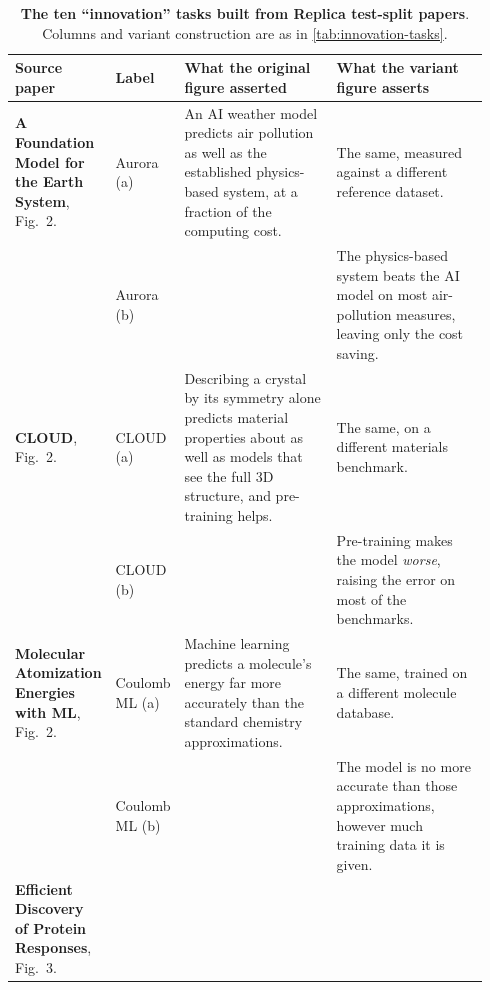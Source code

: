 \documentclass[garamond,a4paper]{inherent}
\begin{document}
\begin{table}[htbp]
    \centering
    \caption{\textbf{The ten ``innovation'' tasks built from Replica test-split papers}. Columns and variant construction are as in \autoref{tab:innovation-tasks}.
    }
    \label{tab:innovation-tasks-test}
    \footnotesize
    \renewcommand{\arraystretch}{1.05}
    \setlength{\tabcolsep}{3pt}
    \begin{tabular}{@{}>{\raggedright\arraybackslash}p{0.165\linewidth} >{\raggedright\arraybackslash}p{0.105\linewidth} >{\raggedright\arraybackslash}p{0.335\linewidth} >{\raggedright\arraybackslash}p{0.335\linewidth}@{}}
        \toprule
        \textbf{Source paper} & \textbf{Label} & \textbf{What the original figure asserted} & \textbf{What the variant figure asserts} \\
        \midrule
        \textbf{A Foundation Model for the Earth System}\newline\cite{bodnar2025aurora}, Fig.~2.
        & Aurora (a) & An AI weather model predicts air pollution as well as the established physics-based system, at a fraction of the computing cost. & The same, measured against a different reference dataset. \\
        & Aurora (b) & & The physics-based system beats the AI model on most air-pollution measures, leaving only the cost saving. \\
        \addlinespace[3pt]
        \textbf{CLOUD}\newline\cite{xu2025cloud}, Fig.~2.
        & CLOUD (a) & Describing a crystal by its symmetry alone predicts material properties about as well as models that see the full 3D structure, and pre-training helps. & The same, on a different materials benchmark. \\
        & CLOUD (b) & & Pre-training makes the model \emph{worse}, raising the error on most of the benchmarks. \\
        \addlinespace[3pt]
        \textbf{Molecular Atomization Energies with ML}\newline\cite{rupp2012fast}, Fig.~2.
        & Coulomb ML (a) & Machine learning predicts a molecule's energy far more accurately than the standard chemistry approximations. & The same, trained on a different molecule database. \\
        & Coulomb ML (b) & & The model is no more accurate than those approximations, however much training data it is given. \\
        \addlinespace[3pt]
        \textbf{Efficient Discovery of Protein Responses}\newline\cite{kangas2014efficient}, Fig.~3.

\end{tabular}
\end{table}
\end{document}

